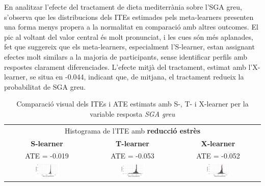\documentclass[../main.tex]{subfiles}
\begin{document}
    En analitzar l’efecte del tractament de dieta mediterrània sobre l’SGA greu, s’observa que les distribucions dels ITEs estimades pels meta-learners presenten una forma menys propera a la normalitat en comparació amb altres outcomes. El pic al voltant del valor central és molt pronunciat, i les cues són més aplanades, fet que suggereix que els meta-learners, especialment l’S-learner, estan assignant efectes molt similars a la majoria de participants, sense identificar perfils amb respostes clarament diferenciades. L’efecte mitjà del tractament, estimat amb l’X-learner, se situa en -0.044, indicant que, de mitjana, el tractament redueix la probabilitat de SGA greu.

    \begin{table}[H]
        \centering
        \begin{tabular}{ccc}
        \multicolumn{3}{c}{Histograma de l'ITE amb \textbf{reducció estrès}} \\
        \small \textbf{S-learner} & \small \textbf{T-learner} & \small \textbf{X-learner} \\
        \footnotesize ATE = -0.019 & \footnotesize ATE = -0.053 & \footnotesize ATE = -0.052 \\
        \includegraphics[width=0.3\textwidth]{imgs/histogrames/hist(severeSGA)S_tract3.jpg} &
        \includegraphics[width=0.3\textwidth]{imgs/histogrames/hist(severeSGA)T_tract3.jpg} &
        \includegraphics[width=0.3\textwidth]{imgs/histogrames/hist(severeSGA)X_tract3.jpg} \\
        \end{tabular}
        \caption{\footnotesize Comparació visual dels ITEs i ATE estimats amb S-, T- i X-learner per la variable resposta \textit{SGA greu}}
        \label{tab:histITE_severeSGA3}
    \end{table}
\end{document}
